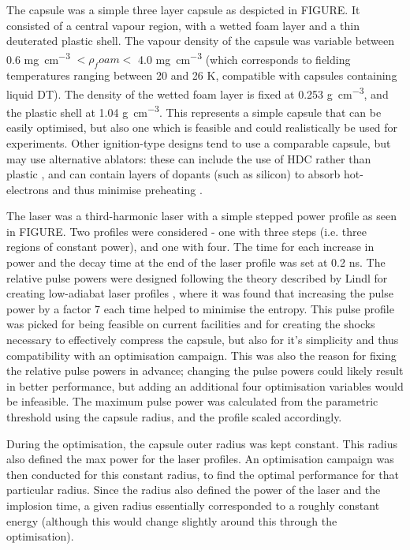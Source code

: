 The capsule was a simple three layer capsule as despicted in FIGURE. It consisted of a central vapour region, with a wetted foam layer and a thin deuterated plastic shell. The vapour density of the capsule was variable between 0.6 \unit{\milli\gram\per\centi\meter\cubed} $< \rho_foam <$ 4.0 \unit{\milli\gram\per\centi\meter\cubed} (which corresponds to fielding temperatures ranging between 20 and 26 K, compatible with capsules containing liquid DT). The density of the wetted foam layer is fixed at 0.253 \unit{\gram\per\centi\meter\cubed}, and the plastic shell at 1.04 \unit{\gram\per\centi\meter\cubed}. This represents a simple capsule that can be easily optimised, but also one which is feasible and could realistically be used for experiments. Other ignition-type designs tend to use a comparable capsule, but may use alternative ablators: these can include the use of HDC rather than plastic \cite{Mackinnon2014}, and can contain layers of dopants (such as silicon) to absorb hot-electrons and thus minimise preheating \cite{Solodov2022}. 

The laser was a third-harmonic laser with a simple stepped power profile as seen in FIGURE. Two profiles were considered - one with three steps (i.e. three regions of constant power), and one with four. The time for each increase in power and the decay time at the end of the laser profile was set at 0.2 \unit{\nano\second}. The relative pulse powers were designed following the theory described by Lindl for creating low-adiabat laser profiles \cite{Lindl1995}, where it was found that increasing the pulse power by a factor 7 each time helped to minimise the entropy. This pulse profile was picked for being feasible on current facilities and for creating the shocks necessary to effectively compress the capsule, but also for it's simplicity and thus compatibility with an optimisation campaign. This was also the reason for fixing the relative pulse powers in advance; changing the pulse powers could likely result in better performance, but adding an additional four optimisation variables would be infeasible. The maximum pulse power was calculated from the parametric threshold using the capsule radius, and the profile scaled accordingly.

During the optimisation, the capsule outer radius was kept constant. This radius also defined the max power for the laser profiles. An optimisation campaign was then conducted for this constant radius, to find the optimal performance for that particular radius. Since the radius also defined the power of the laser and the implosion time, a given radius essentially corresponded to a roughly constant energy (although this would change slightly around this through the optimisation).

